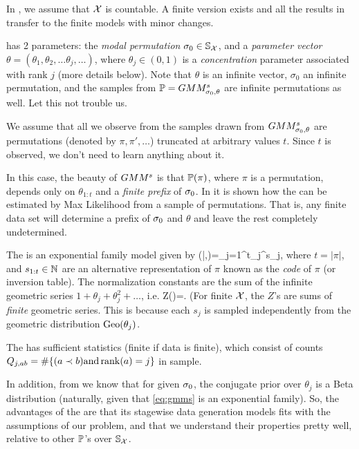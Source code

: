 \documentclass[10pt]{article}
\begin{document}
\benum
\item In \gmms, we assume that ${\mathcal X}$ is countable. A finite version exists and all the results in \cite{MBao} transfer to the finite models with minor changes.
\item \gmms has 2 parameters: the {\em modal permutation} $\sigma_0\in
  {\mathbb S}_{{\mathcal X}}$, and a {\em parameter vector}
  $\theta=(\theta_1,\theta_2,\ldots \theta_j,\ldots)$, where
  $\theta_j\in (0,1)$ is a {\em concentration} parameter associated
  with rank $j$ (more details below). Note that $\theta$ is an
  infinite vector, $\sigma_0$ an infinite permutation, and the samples
  from ${\mathbb P}=GMM^s_{\sigma_0,\theta}$ are infinite permutations as
  well. Let this not trouble us.
\item We assume that all we observe from the samples drawn from $GMM^s_{\sigma_0,\theta}$ are \topt permutations (denoted by $\pi,\pi',\ldots$) truncated at arbitrary values $t$. Since $t$ is observed, we don't need to learn anything about it.
\item
  In this case, the beauty of $GMM^s$ is that ${\mathbb P}(\pi)$, where $\pi$ is a \topt permutation, depends only on $\theta_{1:t}$ and a {\em finite prefix} of $\sigma_0$. In \cite{MBao} it is shown how the \gmms can be estimated by Max Likelihood from a sample of \topt permutations. That is, any finite data set will determine a prefix of $\sigma_0$ and $\theta$ and leave the rest completely undetermined.
\item The \gmms is an exponential family model given by
  \beq
\gmms(\pi|\sigzero,\theta)\;=\;\prod_{j=1}^t\theta_j^{s_j},
\eeq
%
where $t=|\pi|$, and $s_{1:t}\in{\mathbb N}$ are an alternative representation of $\pi$ known as the {\em code} of $\pi$ \cite{Stanley} (or inversion table). The normalization constants are the sum of the infinite geometric series $1+\theta_j+\theta_j^2+\ldots$, i.e.
\beq
Z(\theta)\;=\;.
\eeq
(For finite ${\mathcal X}$, the $Z$'s are sums of {\em finite} geometric series. This is because each $s_j$ is sampled independently from the geometric distribution $\operatorname{Geo}(\theta_j)$.
\item The \gmms has sufficient statistics (finite if data is finite), which consist of counts $Q_{j,ab}=\#\{(a\prec b) \text{and} \operatorname{rank}(a)=j\}$ in sample.
\item In addition, from \cite{MBao} we know that for given $\sigma_0$, the conjugate prior over $\theta_j$ is a Beta distribution (naturally, given that \eqref{eq:gmms} is an exponential family). 
\eenum
So, the advantages of the \gmms are that its stagewise data generation models fits with the assumptions of our problem, and that we understand their properties pretty well, relative to other ${\mathbb P}$'s over ${\mathbb S}_{{\mathcal X}}$.
\end{document}
